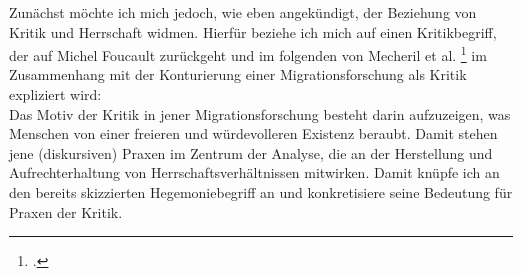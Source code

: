 \noindent Zunächst möchte ich mich jedoch, wie eben angekündigt, der Beziehung von
Kritik und Herrschaft widmen. Hierfür beziehe ich mich auf einen Kritikbegriff,
der auf Michel Foucault zurückgeht und im folgenden von Mecheril et al.
\footnotemark \footcitetext{mecherilmigration} im
Zusammenhang mit der Konturierung einer Migrationsforschung als Kritik
expliziert wird:\\ 

\noindent Das Motiv der Kritik in jener Migrationsforschung
besteht darin aufzuzeigen, was Menschen von einer freieren und würdevolleren
Existenz beraubt. Damit stehen jene (diskursiven) Praxen im Zentrum der
Analyse, die an der Herstellung und Aufrechterhaltung von
Herrschaftsverhältnissen mitwirken.\footnotemark {}
Damit knüpfe ich an den bereits
skizzierten Hegemoniebegriff an und konkretisiere seine Bedeutung für Praxen
der Kritik.\\ 

